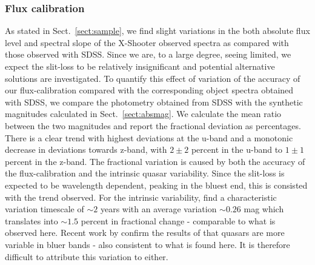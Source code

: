 \documentclass{aa}    %
\newcommand{\sectionname}{Sect.}
\newcommand{\Sect}[1]{\sectionname~\ref{sect:#1}}
\newcommand{\sect}[1]{\Sect{#1}}
\newcommand{\sectlabel}[1]{\label{sect:#1}}
\begin{document}
{%
\subsubsection{Flux calibration}  \sectlabel{Flux calibration}
As stated in \sect{sample}, we find slight variations in the both absolute flux level and spectral slope of the X-Shooter observed spectra as compared with those observed with SDSS. Since we are, to a large degree, seeing limited, we expect the slit-loss to be relatively insignificant and potential alternative solutions are investigated. To quantify this effect of variation of the accuracy of our flux-calibration compared with the corresponding object spectra obtained with SDSS, we compare the photometry obtained from SDSS with the synthetic magnitudes calculated in \sect{absmag}. We calculate the mean ratio between the two magnitudes and report the fractional deviation as percentages. There is a clear trend with highest deviations at the u-band and a monotonic decrease in deviations towards z-band, with $2 \pm 2$ percent in the u-band to $1 \pm 1$ percent in the z-band. The fractional variation is caused by both the accuracy of the flux-calibration and the intrinsic quasar variability. Since the slit-loss is expected to be wavelength dependent, peaking in the bluest end, this is consisted with the trend observed. For the intrinsic variability, \cite{MacLeod2012} find a characteristic variation timescale of $\sim 2$ years with an average variation $\sim 0.26$ mag which translates into $\sim 1.5$ percent in fractional change - comparable to what is observed here. Recent work by \cite{Morganson2014} confirm the results of \cite{Helfand2001} that quasars are more variable in bluer bands - also consistent to what is found here. It is therefore difficult to attribute this variation to either. 


}
\end{document}

